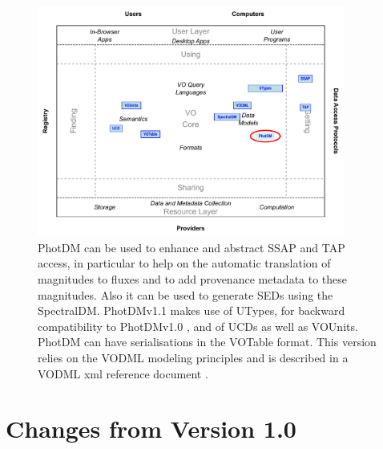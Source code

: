 \documentclass[11pt,a4paper]{ivoa}
\begin{document}
\begin{figure}[H]
\centering


\includegraphics[width=0.9\textwidth]{role_diagram.pdf}
\caption{PhotDM can be used to enhance and abstract SSAP and TAP access, in particular
to help on the automatic translation of magnitudes to fluxes and to add provenance
metadata to these magnitudes. Also it can be used to generate SEDs using the SpectralDM.
PhotDMv1.1 makes use of UTypes, for backward compatibility to PhotDMv1.0 , and of UCDs as well as VOUnits.
PhotDM can have  serialisations in the VOTable format. This version relies on the VODML modeling principles and
is described in a VODML xml reference document .}
\label{fig:archdiag}
\end{figure}

\section*{Changes from Version 1.0} \label{changesTable}

\end{document}

